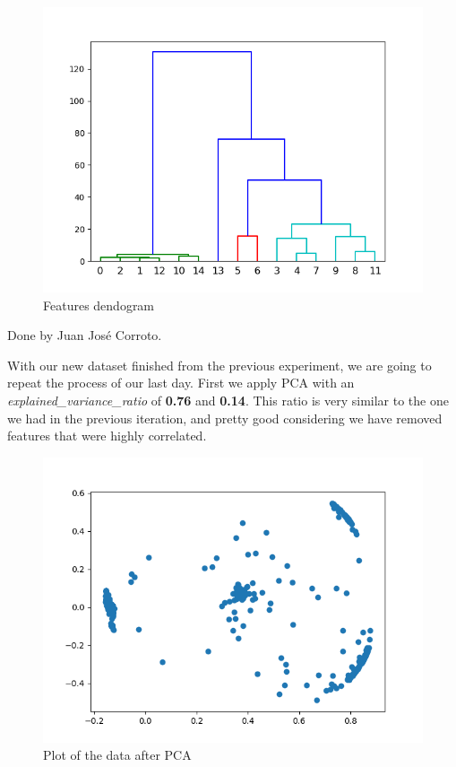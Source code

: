 \documentclass[idxtotoc,hyperref,openany]{labbook} %
\begin{document}
\begin{figure}[h]
\includegraphics[width=0.9\linewidth]{Features_Dendogram_Day1.png}
\setlength\belowcaptionskip{-10pt}
\caption{Features dendogram}
\label{Clustering features}
\end{figure}


Done by Juan Jos\'e Corroto.

With our new dataset finished from the previous experiment, we are going to repeat the process of our last day. First we apply PCA with an \textit{explained\_variance\_ratio} of \textbf{0.76} and \textbf{0.14}. This ratio is very similar to the one we had in the previous iteration, and pretty good considering we have removed features that were highly correlated. 
\\

\begin{figure}[h]
\includegraphics[width=0.9\linewidth]{PCA_Plot_Accelerometer_Day1_Selected.png}
\setlength\belowcaptionskip{-10pt}
\caption{Plot of the data after PCA}
\label{data plot 1 Selected}
\end{figure}
\end{document}
